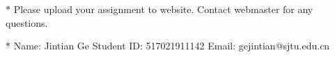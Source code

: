 \documentclass[12pt,a4paper]{article}
\theoremstyle{definition}
\begin{document}
\noindent

\noindent{}
\begin{center}
\footnotesize{\color{red}$*$ Please upload your assignment to website. Contact webmaster for any questions.}

\footnotesize{\color{blue}$*$ Name: Jintian Ge  \quad Student ID: 517021911142 \quad Email: gejintian@sjtu.edu.cn}
\end{center}
\end{document}
